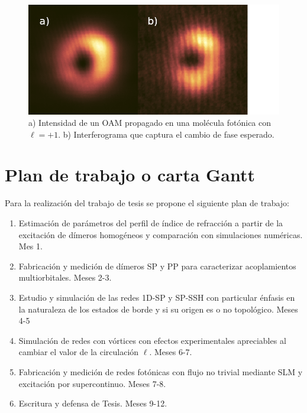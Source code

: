 \documentclass{article}
\begin{document}
\begin{figure}[H]
	\centering
	\includegraphics[width=0.5\linewidth]{./media/vortex.png}
	\caption{a) Intensidad de un OAM propagado en una molécula fotónica con $\ell = +1$. b) Interferograma que captura el cambio de fase esperado. \label{fig:vortex}}
\end{figure} 

\section{Plan de trabajo o carta Gantt}

Para la realización del trabajo de tesis se propone el siguiente plan de trabajo:

\begin{enumerate}
	\item Estimación de parámetros del perfil de índice de refracción a partir de la excitación de dímeros homogéneos y comparación con simulaciones numéricas. Mes 1.
	\item Fabricación y medición de dímeros SP y PP para caracterizar acoplamientos multiorbitales. Meses 2-3.
	\item Estudio y simulación de las redes 1D-SP y SP-SSH con particular énfasis en la naturaleza de los estados de borde y si su origen es o no topológico. Meses 4-5
	\item Simulación de redes con vórtices con efectos experimentales apreciables al cambiar el valor de la circulación $\ell$. Meses 6-7.
	\item Fabricación y medición de redes fotónicas con flujo no trivial mediante SLM y excitación por supercontinuo. Meses 7-8.
	\item Escritura y defensa de Tesis. Meses 9-12.
\end{enumerate}


\renewcommand\refname{Referencias}




\end{document}
